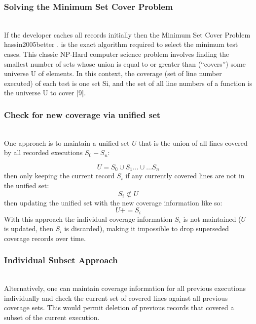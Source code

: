  \subsubsection{Solving the Minimum Set Cover Problem}\label{sec:tuning-2}
 \hfill\\
If the developer caches all records initially then the Minimum Set Cover Problem
hassin2005better \cite{hassin2005better}. is the exact algorithm required to select the minimum test cases.
This classic NP-Hard computer science problem involves finding the smallest number
  of sets whose union is equal to or greater than (“covers”) some universe U of elements.  
  In this context, the coverage (set of line number executed) of each test is one set Si,
 and the set of all line numbers of a function is the universe U to cover [9]. 

\subsubsection{Check for new coverage via unified set}\label{sec:tuning-2}
\hfill\\
One approach is to maintain a unified set $U$ that is the union of all lines 
covered by all recorded executions $S_0-S_n$: 

\begin{equation*}
  U = S_0 \cup S_1 ...\cup... S_n
\end{equation*}
then only keeping the current record $S_i$ if any currently 
covered lines are not in the unified set:
\begin{equation*}
  S_i \not \subset U
\end{equation*}
then updating the unified set with the new coverage information like so:
\begin{equation*}
  U += S_i
\end{equation*} 
With this approach the individual coverage information $S_i$ is not maintained 
($U$ is updated, then $S_i$ is discarded), making it impossible to drop superseded 
coverage records over time.  

\subsubsection{Individual Subset Approach}\label{sec:tuning-2}
\hfill\\
Alternatively, one can maintain coverage information for all previous
 executions individually and check the current set of covered lines
  against all previous coverage sets.  This would permit deletion of 
  previous records that covered a subset of the current execution.  


